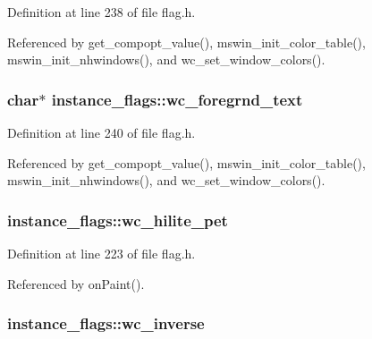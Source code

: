 Definition at line 238 of file flag.\+h.



Referenced by get\+\_\+compopt\+\_\+value(), mswin\+\_\+init\+\_\+color\+\_\+table(), mswin\+\_\+init\+\_\+nhwindows(), and wc\+\_\+set\+\_\+window\+\_\+colors().

\hypertarget{structinstance__flags_ac91fe1569b4bfb4746b6531a98577b86}{
\subsubsection[{wc\+\_\+foregrnd\+\_\+text}]{\setlength{\rightskip}{0pt plus 5cm}char$\ast$ instance\+\_\+flags\+::wc\+\_\+foregrnd\+\_\+text}}\label{structinstance__flags_ac91fe1569b4bfb4746b6531a98577b86}


Definition at line 240 of file flag.\+h.



Referenced by get\+\_\+compopt\+\_\+value(), mswin\+\_\+init\+\_\+color\+\_\+table(), mswin\+\_\+init\+\_\+nhwindows(), and wc\+\_\+set\+\_\+window\+\_\+colors().

\hypertarget{structinstance__flags_a39b61413550ed104f741d52da8dec685}{
\subsubsection[{wc\+\_\+hilite\+\_\+pet}]{ instance\+\_\+flags\+::wc\+\_\+hilite\+\_\+pet}}\label{structinstance__flags_a39b61413550ed104f741d52da8dec685}


Definition at line 223 of file flag.\+h.



Referenced by on\+Paint().

\hypertarget{structinstance__flags_a6aa2cebb9cd28d62a78a78647eb8e7c9}{
\subsubsection[{wc\+\_\+inverse}]{ instance\+\_\+flags\+::wc\+\_\+inverse}}\label{structinstance__flags_a6aa2cebb9cd28d62a78a78647eb8e7c9}


